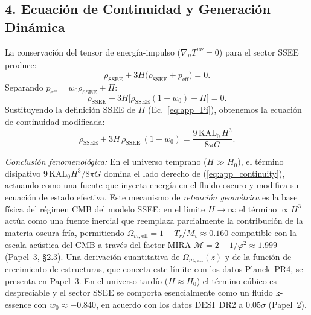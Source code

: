 \subsection*{4. Ecuación de Continuidad y Generación Dinámica}

La conservación del tensor de energía-impulso
($\nabla_{\!\mu}T^{\mu\nu} = 0$) para el sector SSEE produce:
%
\begin{equation}
  \dot{\rho}_{\mathrm{SSEE}}
    + 3H\bigl(\rho_{\mathrm{SSEE}} + p_{\mathrm{eff}}\bigr) = 0.
  \label{eq:app_cons_raw}
\end{equation}
%
Separando $p_{\mathrm{eff}} = w_{0}\rho_{\mathrm{SSEE}} + \Pi$:
%
\begin{equation}
  \dot{\rho}_{\mathrm{SSEE}}
    + 3H\bigl[\rho_{\mathrm{SSEE}}(1 + w_{0}) + \Pi\bigr] = 0.
  \label{eq:app_cons_split}
\end{equation}
%
Sustituyendo la definición SSEE de $\Pi$ (Ec.~\ref{eq:app_Pi}),
obtenemos la ecuación de continuidad modificada:
%
\begin{equation}
  \dot{\rho}_{\mathrm{SSEE}}
    + 3H\,\rho_{\mathrm{SSEE}}\,(1 + w_{0})
    = \frac{9\,\mathrm{KAL}_{0}\,H^{3}}{8\pi G}.
  \label{eq:app_continuity}
\end{equation}

\textit{Conclusión fenomenológica:}
En el universo temprano ($H \gg H_{0}$), el término disipativo
$9\,\mathrm{KAL}_{0}H^{3}/8\pi G$ domina el lado derecho de
(\ref{eq:app_continuity}), actuando como una fuente que inyecta energía
en el fluido oscuro y modifica su ecuación de estado efectiva.
Este mecanismo de \emph{retención geométrica} es la base física del
régimen CMB del modelo SSEE: en el límite $H \to \infty$ el término
$\propto H^{3}$ actúa como una fuente inercial que reemplaza parcialmente
la contribución de la materia oscura fría, permitiendo
$\Omega_{m,\mathrm{eff}} = 1 - T_{r}/M_{v} \approx 0.160$
compatible con la escala acústica del CMB a través del factor MIRA
$\mathcal{M} = 2 - 1/\varphi^{2} \approx 1.999$ (Papel~3, §2.3).
Una derivación cuantitativa de $\Omega_{m,\mathrm{eff}}(z)$ y de la
función de crecimiento de estructuras, que conecta este límite con los
datos Planck~PR4, se presenta en Papel~3.
En el universo tardío ($H \approx H_{0}$) el término cúbico es
despreciable y el sector SSEE se comporta esencialmente como un fluido
k-essence con $w_{0} \approx -0.840$, en acuerdo con los datos DESI~DR2
a $0.05\sigma$ (Papel~2).
